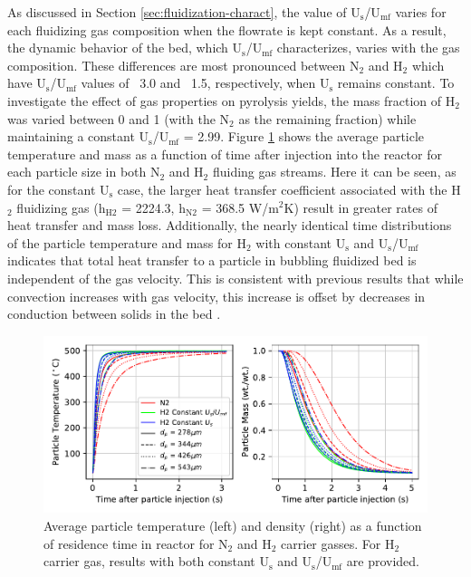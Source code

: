 As discussed in Section \ref{sec:fluidization-charact}, the value of U$_\text{s}$/U$_\text{mf}$ varies for each fluidizing gas composition when the flowrate is kept constant. As a result, the dynamic behavior of the bed, which U$_\text{s}$/U$_\text{mf}$ characterizes, varies with the gas composition. These differences are most pronounced between N$_2$ and H$_2$ which have U$_\text{s}$/U$_\text{mf}$ values of ~3.0 and ~1.5, respectively, when U$_\text{s}$ remains constant. To investigate the effect of gas properties on pyrolysis yields, the mass fraction of H$_2$ was varied between 0 and 1 (with the N$_2$ as the remaining fraction) while maintaining a constant U$_\text{s}$/U$_\text{mf}$ = 2.99. Figure \ref{fig:cfd-constuumf-particle-temp-density} shows the average particle temperature and mass as a function of time after injection into the reactor for each particle size in both N$_{2}$ and H$_{2}$ fluiding gas streams. Here it can be seen, as for the constant U$_\text{s}$ case, the larger heat transfer coefficient associated with the H$_2$ fluidizing gas (h$_\text{H2}$ = 2224.3, h$_\text{N2}$ = 368.5 W/m$^2$K) result in greater rates of heat transfer and mass loss. Additionally, the nearly identical time distributions of the particle temperature and mass for H$_2$ with constant U$_\text{s}$ and U$_\text{s}$/U$_\text{mf}$ indicates that total heat transfer to a particle in bubbling fluidized bed is independent of the gas velocity. This is consistent with previous results that while convection increases with gas velocity, this increase is offset by decreases in conduction between solids in the bed \cite{Collier-2004,zhou2009particle}.

\begin{figure}[H]
    \centering
    \includegraphics[width=\textwidth]{figures/cfd-constuumf-particle-temp-density.pdf}
    \caption{Average particle temperature (left) and density (right) as a function of residence time in reactor for N$_2$ and H$_2$ carrier gasses. For H$_2$ carrier gas, results with both constant U$_\text{s}$ and U$_\text{s}$/U$_\text{mf}$ are provided.}
    \label{fig:cfd-constuumf-particle-temp-density}
\end{figure}

